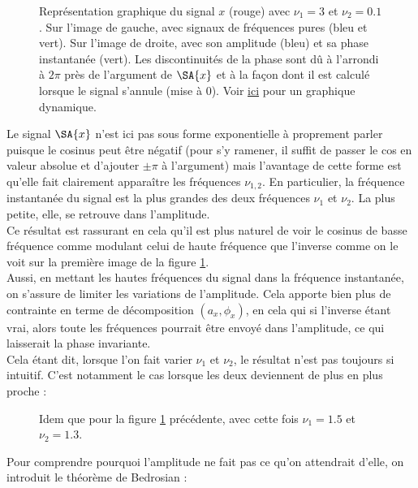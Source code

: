 \begin{figure}[h]\centering
	\caption{Représentation graphique du signal $x$ (rouge) avec $\nu_1=3$ et $\nu_2=0.1$. Sur l'image de gauche, avec signaux de fréquences pures (bleu et vert). Sur l'image de droite, avec son amplitude (bleu) et sa phase instantanée (vert). Les discontinuités de la phase sont dû à l'arrondi à $2\pi$  près de l'argument de $\SA{x}$ et à la façon dont il est calculé lorsque le signal s'annule (mise à 0). Voir \href{https://www.desmos.com/calculator/gcedcdfkhr}{ici} pour un graphique dynamique.}
	\label{fig:exemple_tSA_1/2}
\end{figure}
\noindent
Le signal $\SA{x}$ n'est ici pas sous forme exponentielle à proprement parler puisque le cosinus peut être négatif (pour s'y ramener, il suffit de passer le cos en valeur absolue et d'ajouter $\pm\pi$ à l'argument) mais l’avantage de cette forme est qu'elle fait clairement apparaître les fréquences $\nu_{1,2}$. En particulier, la fréquence instantanée du signal est la plus grandes des deux fréquences $\nu_1$ et $\nu_2$. La plus petite, elle, se retrouve dans l'amplitude. 
\\
Ce résultat est rassurant en cela qu'il est plus naturel de voir le cosinus de basse fréquence comme modulant celui de haute fréquence que l'inverse comme on le voit sur la première image de la figure \ref{fig:exemple_tSA_1/2}. 
\\
Aussi, en mettant les hautes fréquences du signal dans la fréquence instantanée, on s'assure de limiter les variations de l'amplitude. Cela apporte bien plus de contrainte en terme de décomposition $(a_x,\phi_x)$, en cela qui si l'inverse étant vrai, alors toute les fréquences pourrait être envoyé dans l'amplitude, ce qui laisserait la phase invariante.
\\

Cela étant dit, lorsque l'on fait varier $\nu_1$ et $\nu_2$, le résultat n'est pas toujours si intuitif. C'est notamment le cas lorsque les deux deviennent de plus en plus proche :

\begin{figure}[h]\centering
	\caption{Idem que pour la figure \ref{fig:exemple_tSA_1/2} précédente, avec cette fois $\nu_1=1.5$ et $\nu_2=1.3$.}
	\label{fig:exemple_tSA_2/2}
\end{figure}

Pour comprendre pourquoi l'amplitude ne fait pas ce qu'on attendrait d'elle, on introduit le théorème de Bedrosian :

